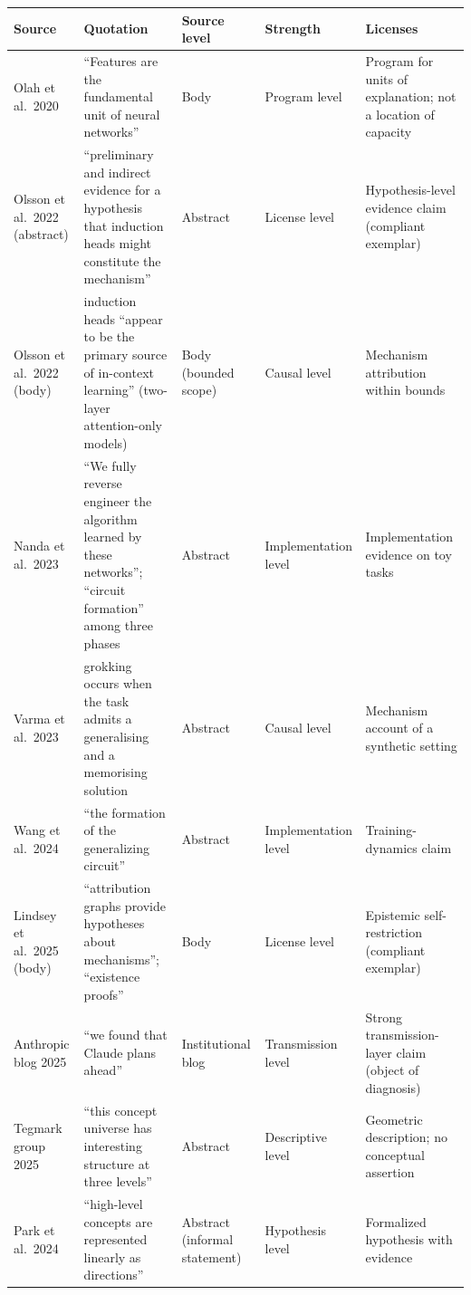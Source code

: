\documentclass[10pt]{article}
\begin{document}
\begin{longtable}{p{3.2cm} p{4.8cm} p{1.7cm} p{1.5cm} p{3.0cm}}
\toprule
Source & Quotation & Source level & Strength & Licenses \\
\midrule
\endhead
Olah et al.\ 2020\cite{olah2020zoomin} & ``Features are the fundamental unit of neural networks'' & Body & Program level & Program for units of explanation; not a location of capacity \\
Olsson et al.\ 2022 (abstract)\cite{olsson2022induction} & ``preliminary and indirect evidence for a hypothesis that induction heads might constitute the mechanism'' & Abstract & License level & Hypothesis-level evidence claim (compliant exemplar) \\
Olsson et al.\ 2022 (body)\cite{olsson2022induction} & induction heads ``appear to be the primary source of in-context learning'' (two-layer attention-only models) & Body (bounded scope) & Causal level & Mechanism attribution within bounds \\
Nanda et al.\ 2023\cite{nanda2023progress} & ``We fully reverse engineer the algorithm learned by these networks''; ``circuit formation'' among three phases & Abstract & Implementation level & Implementation evidence on toy tasks \\
Varma et al.\ 2023\cite{varma2023circuit} & grokking occurs when the task admits a generalising and a memorising solution & Abstract & Causal level & Mechanism account of a synthetic setting \\
Wang et al.\ 2024\cite{wang2024grokked} & ``the formation of the generalizing circuit'' & Abstract & Implementation level & Training-dynamics claim \\
Lindsey et al.\ 2025 (body)\cite{lindsey2025biology} & ``attribution graphs provide hypotheses about mechanisms''; ``existence proofs'' & Body & License level & Epistemic self-restriction (compliant exemplar) \\
Anthropic blog 2025\cite{anthropic2025thoughts} & ``we found that Claude plans ahead'' & Institutional blog & Transmission level & Strong transmission-layer claim (object of diagnosis) \\
Tegmark group 2025\cite{tegmark2024geometry} & ``this concept universe has interesting structure at three levels'' & Abstract & Descriptive level & Geometric description; no conceptual assertion \\
Park et al.\ 2024\cite{park2024linear} & ``high-level concepts are represented linearly as directions'' & Abstract (informal statement) & Hypothesis level & Formalized hypothesis with evidence \\

\end{longtable}
\end{document}

